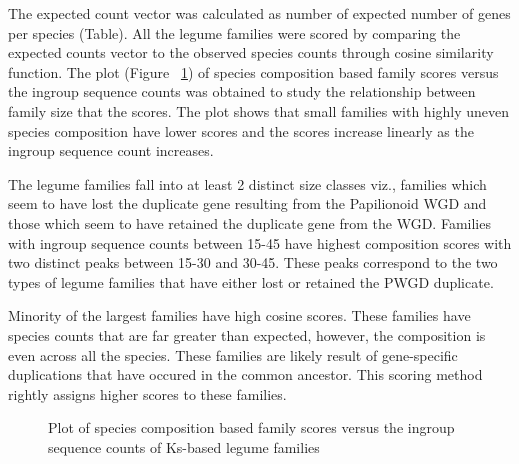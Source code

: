 \documentclass{article}
\begin{document}
		The expected count vector was calculated as number of expected number of genes per species (Table). All the legume families were scored by comparing the expected counts vector to the observed species counts through cosine similarity function. The plot (Figure ~\ref{fig:scatter_famsize_vs_species_comp_cosine_score}) of species composition based family scores versus the ingroup sequence counts was obtained to study the relationship between family size that the scores. The plot shows that small families with highly uneven species composition have lower scores and the scores increase linearly as the ingroup sequence count increases.
		
		The legume families fall into at least 2 distinct size classes viz., families which seem to have lost the duplicate gene resulting from the Papilionoid WGD and those which seem to have retained the duplicate gene from the WGD. Families with ingroup sequence counts between 15-45 have highest composition scores with two distinct peaks between 15-30 and  30-45. These peaks correspond to the two types of legume families that have either lost or retained the PWGD duplicate.
		
		Minority of the largest families have high cosine scores.  These families have species counts that are far greater than expected, however, the composition is even across all the species. These families are likely result of gene-specific duplications that have occured in the common ancestor. This scoring method rightly assigns higher scores to these families.
		
		\begin{figure}[h!]
			\caption{Plot of species composition based family scores versus the ingroup sequence counts of Ks-based legume families}
			\label{fig:scatter_famsize_vs_species_comp_cosine_score}
		\end{figure}
		
\end{document}
